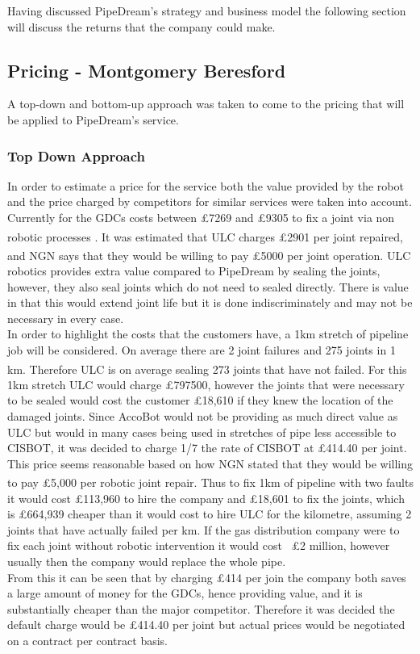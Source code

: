 \documentclass[11pt]{article}		%
\newcommand{\supercite}[1]{\textsuperscript{\cite{#1}}}		%
\begin{document}
 	Having discussed PipeDream's strategy and business model the following section will discuss the  returns that the company could make.
        \subsection[Pricing]{Pricing - Montgomery Beresford} \label{revenue_model}
        
        A top-down and bottom-up approach was taken to come to the pricing that will be applied to PipeDream's service.
        
            
        	\subsubsection{Top Down Approach}
	            In order to estimate a price for the service both the value provided by the robot and the price charged by competitors for similar services were taken into account. Currently for the GDCs costs between £7269 and £9305 to fix a joint via non robotic processes \supercite{NYT}. It was estimated that ULC charges £2901 per joint repaired,\supercite{NYT} and NGN says that they would be willing to pay £5000 per joint operation. \supercite{NGN} 
	            ULC robotics provides extra value compared to PipeDream by sealing the joints, however, they also seal joints which do not need to sealed directly. There is value in that this would extend joint life but it is done indiscriminately and may not be necessary in every case.
	            \\
	            In order to highlight the costs that the customers have, a 1km stretch of pipeline job will be considered. On average there are 2 joint failures and 275 joints in 1 km. \supercite{SGN_Southern} Therefore ULC is on average sealing 273 joints that have not failed. For this 1km stretch ULC would charge £797500, however the joints that were necessary to be sealed would cost the customer £18,610 if they knew the location of the damaged joints. Since AccoBot would not be providing as much direct value as ULC but would in many cases being used in stretches of pipe less accessible to CISBOT, it was decided to charge 1/7 the rate of CISBOT at £414.40 per joint. This price seems reasonable based on how NGN stated that they would be willing to pay £5,000 per robotic joint repair.\supercite{NGN} Thus to fix 1km of pipeline with two faults it would cost £113,960 to hire the company and £18,601 to fix the joints, which is £664,939 cheaper than it would cost to hire ULC for the kilometre, assuming 2 joints that have actually failed per km. If the gas distribution company were to fix each joint without robotic intervention it would cost ~£2 million, however usually then the company would replace the whole pipe.
	            \\
	            From this it can be seen that by charging £414 per join the company both saves a large amount of money for the GDCs, hence providing value, and it is substantially cheaper than the major competitor. Therefore it was decided the default charge would be £414.40 per joint but actual prices would be negotiated on a contract per contract basis.
\end{document}
